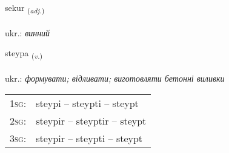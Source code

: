 \documentclass[frontgrid, backgrid]{flacards}\usepackage[]{graphicx}\usepackage[]{xcolor}
\begin{document}
\renewcommand{\flhead}{\vskip5pt \fboxsep=0pt {\small\bfseries\footnotesize Lýsingarorð | прикметник}}
\renewcommand{\fcfoot}{\vskip5pt \fboxsep=0pt \hspace{2pt}{\small\bfseries\footnotesize 3K}}

\renewcommand{\blhead}{\vskip5pt {\small\bfseries\footnotesize Lýsingarorð | прикметник }}
\renewcommand{\bcfoot}{\vskip5pt \hspace{2pt}{\small\bfseries\footnotesize 3K}}


{sekur \small{\textsubscript{(\textit{adj.})}} \\[1ex] %
\textphonetic{[sɛːkʏr]} \\
ukr.: \emph{винний} \\  [2ex]
\renewcommand*{\arraystretch}{0.8}
}

\renewcommand{\flhead}{\vskip5pt \fboxsep=0pt {\small\bfseries\footnotesize Sagnorð | дієслово}}
\renewcommand{\fcfoot}{\vskip5pt \fboxsep=0pt \hspace{2pt}{\small\bfseries\footnotesize 3K}}

\renewcommand{\blhead}{\vskip5pt {\small\bfseries\footnotesize Sagnorð | дієслово }}
\renewcommand{\bcfoot}{\vskip5pt \hspace{2pt}{\small\bfseries\footnotesize 3K}}


{steypa \small{\textsubscript{(\textit{v.})}} \\[1ex] %
\textphonetic{[steiːpa]} \\
ukr.: \emph{формувати; відливати; виготовляти бетонні виливки} \\  [2ex]
\renewcommand*{\arraystretch}{0.8}
\begin{tabular}{p{1cm}l}
\textsc{1sg}: & steypi -- steypti -- steypt \\ 
\textsc{2sg}: & steypir -- steyptir -- steypt \\ 
\textsc{3sg}: & steypir -- steypti -- steypt \\ 
\end{tabular}
}
\end{document}
